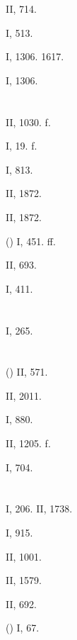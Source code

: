  II, 714.

 I, 513.

 I, 1306. 1617.

 I, 1306.

\section{}

 II, 1030. f.

 I, 19. f.

 I, 813.

 II, 1872.

 II, 1872.

 () I, 451. ff.

 II, 693.

 I, 411.

\section{}

 I, 265.

\section{}

 () II, 571.

 II, 2011.

 I, 880.

 II, 1205. f.

 I, 704.

\section{}

 I, 206. II, 1738.

 I, 915.

 II, 1001.

 II, 1579.

 II, 692.

 () I, 67.

